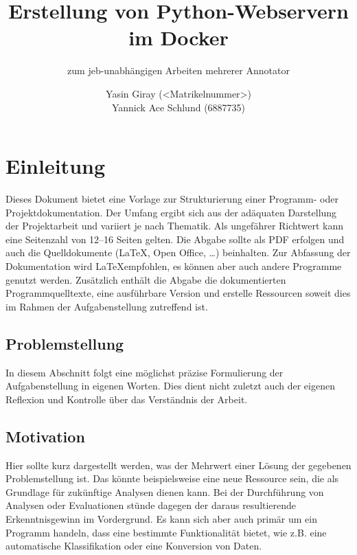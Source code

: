 \documentclass[pagesize=auto, titlepage=on]{scrartcl}
\begin{document}
\titlehead{Praktikum Deep Learning for Text Imaging \hfill Goethe-Universtität Frankfurt am Main}
\subject{Typisierung der Arbeit}
\author{Yasin Giray (<Matrikelnummer>) \\ Yannick Ace Schlund (6887735)}
\title{Erstellung von Python-Webservern im Docker}
\subtitle{zum jeb-unabhängigen Arbeiten mehrerer Annotator}
\publishers{Guiseppe Abrami \& Daniel Baumartz}

\maketitle

\tableofcontents

\section{Einleitung}
\label{sec:einleitung}
Dieses Dokument bietet eine Vorlage zur Strukturierung einer Programm- oder Projektdokumentation.
Der Umfang ergibt sich aus der adäquaten Darstellung der Projektarbeit und variiert je nach Thematik.
Als ungefährer Richtwert kann eine Seitenzahl von 12--16 Seiten gelten.
Die Abgabe sollte als PDF erfolgen und auch die Quelldokumente (\LaTeX, Open Office, \ldots) beinhalten.
Zur Abfassung der Dokumentation wird \LaTeX empfohlen, es können aber auch andere Programme genutzt werden.
Zusätzlich enthält die Abgabe die dokumentierten Programmquelltexte, eine ausführbare Version und erstelle Ressourcen
soweit dies im Rahmen der Aufgabenstellung zutreffend ist.

\subsection{Problemstellung}
\label{sec:problemstellung}
In diesem Abschnitt folgt eine möglichst präzise Formulierung der Aufgabenstellung in eigenen Worten.
Dies dient nicht zuletzt auch der eigenen Reflexion und Kontrolle über das Verständnis der Arbeit.

\subsection{Motivation}
\label{sec:motivation}
Hier sollte kurz dargestellt werden, was der Mehrwert einer Lösung der gegebenen Problemstellung ist.
Das könnte beispielsweise eine neue Ressource sein, die als Grundlage für zukünftige Analysen dienen kann.
Bei der Durchführung von Analysen oder Evaluationen stünde dagegen der daraus resultierende Erkenntnisgewinn im Vordergrund.
Es kann sich aber auch primär um ein Programm handeln, dass eine bestimmte Funktionalität bietet, wie z.B. eine automatische Klassifikation oder eine Konversion von Daten.
\end{document}
